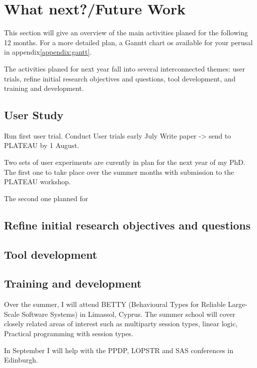 \section{What next?/Future Work}
\label{sec:future}
This section will give an overview of the main activities planed for the following 12 months. For a more detailed plan, a Ganntt chart os available for your perusal in appendix\ref{appendix:gantt}.


The activities planed for next year fall into several interconnected themes: user trials, refine initial research objectives and questions, tool development, and training and development.

\subsection{User Study}
\label{subs:User Study}
Run first user trial.
Conduct User trials early July
Write paper -> send to PLATEAU by 1 August.%

Two sets of user experiments are curently in plan for the next year of my PhD.
The first one to take place over the summer months with submission to the PLATEAU workshop.


The second one planned for
\subsection{Refine initial research objectives and questions}

\subsection{Tool development}

\subsection{Training and development}

Over the summer, I will attend BETTY (Behavioural Types for Reliable Large-Scale Software Systems) in Limassol, Cyprus. The summer school will cover closely related areas of interest such as multiparty session types, linear logic, Practical programming with session types.

In September I will help with the PPDP, LOPSTR and SAS conferences in Edinburgh.
